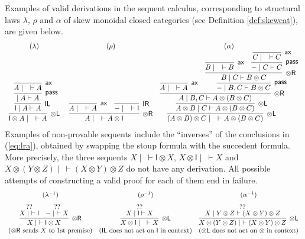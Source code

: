 \documentclass[submission,copyright,creativecommons]{eptcs}
\theoremstyle{definition}
\newcommand{\tl}{\otimes \mathsf{L}}
\newcommand{\tr}{\otimes \mathsf{R}}
\newcommand{\pass}{\mathsf{pass}}
\newcommand{\unitl}{\mathsf{IL}}
\newcommand{\unitr}{\mathsf{IR}}
\newcommand{\ax}{\mathsf{ax}}
\newcommand{\ot}{\otimes}
\newcommand{\I}{\mathsf{I}}
\begin{document}
Examples of valid derivations in the sequent calculus, corresponding to structural laws $\lambda$, $\rho$ and $\alpha$ of skew monoidal closed categories (see Definition \ref{def:skewcat}), are given below. %
\begin{equation}\label{eq:lra}
  \begin{array}{c@{\;\quad}cc}
  (\lambda) & (\rho) & (\alpha) \\
  \infer[\tl]{\I \ot A \mid \quad \vdash A}{
    \infer[\unitl]{\I \mid A \vdash A}{
      \infer[\pass]{ \mid A \vdash A}{
        \infer[\ax]{A \mid \quad \vdash A}{}
      }
    }
  }
  &
  \infer[\tr]{A \mid \quad \vdash A \ot \I}{
    \infer[\ax]{A \mid \quad \vdash A}{}
    &
    \infer[\unitr]{- \mid \quad \vdash \I}{}
  }
  &
  \infer[\tl]{(A \ot B) \ot C \mid \quad \vdash A \ot (B \ot C)}{
    \infer[\tl]{A \ot B \mid C \vdash A \ot (B \ot C)}{
      \infer[\tr]{A \mid B , C \vdash A \ot (B \ot C)}{
        \infer[\ax]{A \mid \quad \vdash A}{}
        &
        \infer[\pass]{- \mid B , C \vdash B \ot C}{
          \infer[\tr]{B \mid C \vdash B \ot C}{
            \infer[\ax]{B \mid \quad \vdash B}{}
            &
            \infer[\pass]{- \mid C \vdash C}{
              \infer[\ax]{C \mid \quad \vdash C}{}
            }
          }
        }
      }
    }
  }
  \end{array}
\end{equation}
Examples of non-provable sequents include the ``inverses'' of the conclusions in (\ref{eq:lra}), obtained by swapping the stoup formula with the succedent formula.
More precisely, the three sequents $X \mid ~ \vdash \I \ot X$, $X \ot \I \mid ~ \vdash X$ and $X \ot (Y \ot Z) \mid ~ \vdash (X \ot Y) \ot Z$ do not have any derivation. All possible attempts of constructing a valid proof for each of them end in failure.
\begin{displaymath}
  \begin{array}{ccc}
  (\lambda^{-1}) & (\rho^{-1}) & (\alpha^{-1}) \\[6pt]
    \infer[\tr]{X \mid ~\vdash \I \ot X}{
      \deduce[??]{X \mid ~ \vdash \I}{
      }
      &
      \deduce[??]{- \mid ~ \vdash X}{
      }
    }
    &
    \infer[\tl]{X \ot \I \mid \quad \vdash X}{
      \deduce{X \mid \I \vdash X}{??}
    }
    &
    \infer[\tl]{X \ot (Y \ot Z) \mid ~\vdash (X \ot Y) \ot Z}{
      \deduce{X \mid Y \ot Z \vdash (X \ot Y) \ot Z}{??}
    } \\
    (\text{$\tr$ sends $X$ to 1st premise}) &
    (\text{$\unitl$ does not act on $\I$ in context}) &
    (\text{$\tl$ does not act on $\ot$ in context})
  \end{array}
\end{displaymath}
\end{document}
